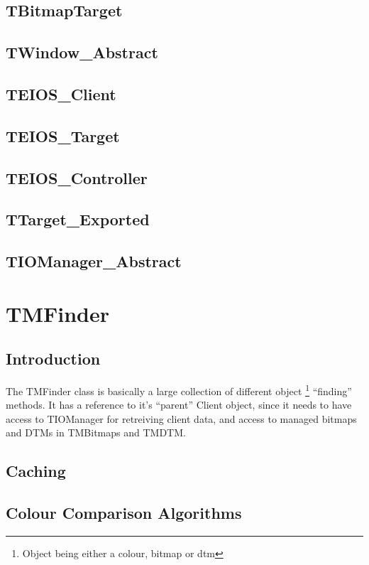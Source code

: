 \documentclass[a4paper, 10pt]{report} %
\begin{document}
\subsection{TBitmapTarget}
\subsection{TWindow\_Abstract}
\subsection{TEIOS\_Client}
\subsection{TEIOS\_Target}
\subsection{TEIOS\_Controller}
\subsection{TTarget\_Exported}
\subsection{TIOManager\_Abstract}

\section{TMFinder}

\subsection{Introduction}

The TMFinder class is basically a large collection of different object
\footnote{Object being either a colour, bitmap or dtm} ``finding'' methods.
It has a reference to it's ``parent'' Client object, since it needs to have
access to TIOManager for retreiving client data, and access to managed bitmaps
and DTMs in TMBitmaps and TMDTM.


\subsection{Caching}

\subsection{Colour Comparison Algorithms}
\end{document}
